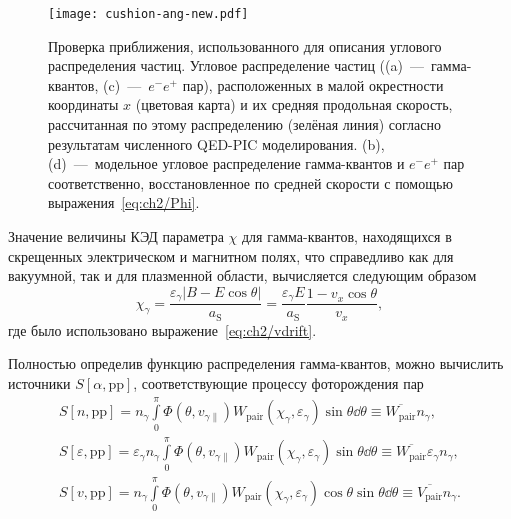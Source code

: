 \begin{figure}[ht]
    \texttt{[image: cushion-ang-new.pdf]}
    \caption[Проверка приближения, использованного для описания углового распределения частиц.]{\label{fig:ch2/sec3/ang}
    Проверка приближения, использованного для описания углового распределения частиц. Угловое распределение частиц ((a)~---~гамма-квантов, (c)~---~$e^-e^+$ пар), расположенных в малой окрестности координаты $x$ (цветовая карта) и их средняя продольная скорость, рассчитанная по этому распределению (зелёная линия) согласно результатам численного QED-PIC моделирования. (b), (d)~---~модельное угловое распределение гамма-квантов и $e^-e^+$ пар соответственно, восстановленное по средней скорости с помощью выражения~\eqref{eq:ch2/Phi}. }
\end{figure}

Значение величины КЭД параметра $\chi$ для гамма-квантов, находящихся в скрещенных электрическом и магнитном полях, что справедливо как для вакуумной, так и для плазменной области, вычисляется следующим образом
\begin{equation}
    \chi_\gamma = \frac{\varepsilon_\gamma \left| B - E\cos\theta \right|}{a_\mathrm{S}} = \frac{\varepsilon_\gamma E }{a_\mathrm{S}}\frac{1- v_x\cos\theta }{v_x},
\end{equation}
где было использовано выражение~\eqref{eq:ch2/vdrift}.

Полностью определив функцию распределения гамма-квантов, можно вычислить источники $S[\alpha, \mathrm{pp}]$, соответствующие процессу фоторождения пар
\begin{align}
    S[n,\mathrm{pp}] =  n_\gamma\int\limits_0^\pi \Phi(\theta, v_{\gamma\parallel}) W_\mathrm{pair}(\chi_\gamma,\varepsilon_\gamma) \sin\theta \dd\theta \equiv \overline{W_\mathrm{pair}} n_\gamma , \\
    S[\varepsilon,\mathrm{pp}] = \varepsilon_\gamma n_\gamma\int\limits_0^\pi \Phi(\theta, v_{\gamma\parallel}) W_\mathrm{pair}(\chi_\gamma,\varepsilon_\gamma) \sin\theta \dd\theta \equiv \overline{W_\mathrm{pair}} \varepsilon_\gamma n_\gamma ,\\
    S[v,\mathrm{pp}] = n_\gamma\int\limits_0^\pi \Phi(\theta, v_{\gamma\parallel}) W_\mathrm{pair}(\chi_\gamma,\varepsilon_\gamma)\cos\theta \sin\theta \dd\theta \equiv \overline{V_\mathrm{pair}} n_\gamma .
\end{align}

